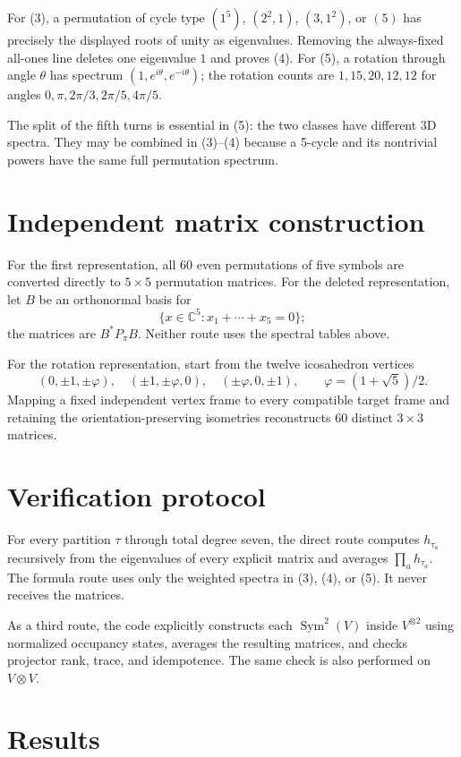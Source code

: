 \documentclass[11pt]{article}
\newcommand{\Sym}{\operatorname{Sym}}
\begin{document}
For (3), a permutation of cycle type $(1^5)$, $(2^2,1)$, $(3,1^2)$,
or $(5)$ has precisely the displayed roots of unity as eigenvalues.  Removing
the always-fixed all-ones line deletes one eigenvalue $1$ and proves (4).
For (5), a rotation through angle $\theta$ has spectrum
$(1,e^{i\theta},e^{-i\theta})$; the rotation counts are
$1,15,20,12,12$ for angles $0,\pi,2\pi/3,2\pi/5,4\pi/5$.

The split of the fifth turns is essential in (5): the two classes have
different 3D spectra.  They may be combined in (3)--(4) because a 5-cycle and
its nontrivial powers have the same full permutation spectrum.

\section{Independent matrix construction}

For the first representation, all 60 even permutations of five symbols are
converted directly to $5\times5$ permutation matrices.  For the deleted
representation, let $B$ be an orthonormal basis for
\[
\{x\in\mathbb C^5:x_1+\cdots+x_5=0\};
\]
the matrices are $B^*P_\pi B$.  Neither route uses the spectral tables above.

For the rotation representation, start from the twelve icosahedron vertices
\[
(0,\pm1,\pm\varphi),\quad(\pm1,\pm\varphi,0),\quad
(\pm\varphi,0,\pm1),\qquad \varphi=(1+\sqrt5)/2.
\]
Mapping a fixed independent vertex frame to every compatible target frame and
retaining the orientation-preserving isometries reconstructs 60 distinct
$3\times3$ matrices.

\section{Verification protocol}

For every partition $\tau$ through total degree seven, the direct route
computes $h_{\tau_a}$ recursively from the eigenvalues of every explicit
matrix and averages $\prod_a h_{\tau_a}$.  The formula route uses only the
weighted spectra in (3), (4), or (5).  It never receives the matrices.

As a third route, the code explicitly constructs each $\Sym^2(V)$ inside
$V^{\otimes2}$ using normalized occupancy states, averages the resulting
matrices, and checks projector rank, trace, and idempotence.  The same check is
also performed on $V\otimes V$.

\section{Results}
\end{document}

